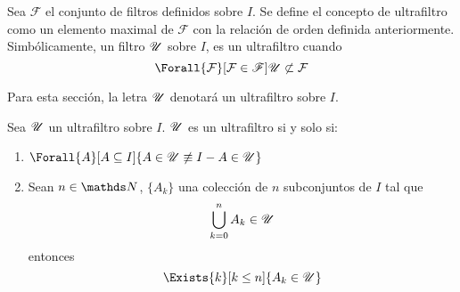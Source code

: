 \begin{definition}
  Sea $\mathscr{F}$ el conjunto de filtros definidos sobre $I$. Se define
  el concepto de ultrafiltro como un elemento maximal de $\mathscr{F}$ con
  la relación de orden definida anteriormente. Simbólicamente,
  un filtro $\mathscr{U}$ sobre $I$, es un ultrafiltro cuando
  \[\Forall{\F}[\F\in\mathscr{F}]{\U\not\subset\F}\]

  Para esta sección, la letra $\mathscr{U}$ denotará un ultrafiltro sobre $I$.
\end{definition}

\begin{theorem}[Caracterizaciones]
  Sea $\mathscr{U}$ un ultrafiltro sobre $I$. $\mathscr{U}$ es un ultrafiltro si y solo si:
  \begin{enumerate}
    \item $\Forall{A}[A\subseteq I]{A\in\U \not\equiv I-A \in \U}$
    \item Sean $n\in\N$, $\{A_k\}$ una colección de $n$ subconjuntos de $I$ tal que
          \[\bigcup_{k=0}^n A_k \in \mathscr{U}\]
          entonces
          \[\Exists{k}[k\leq n]{A_k\in\U}\]
  \end{enumerate}
\end{theorem}

